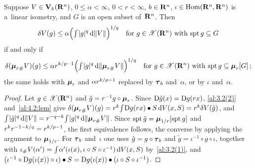 \begin{lemma}
    \label{al:8.2}
    Suppose $V \in \mathbf{V}_{k}(\mathbf{R}^{n})$, $0 \le \alpha < \infty$, $0 < r < \infty$, $b \in
    \mathbf{R}^{n}$, $\iota \in \operatorname{Hom}(\mathbf{R}^{n},\mathbf{R}^{n})$ is a~linear isometry, and $G$ is an open
    subset of~$\mathbf{R}^{n}$. Then
    \begin{displaymath}
        \delta V(g) \le \alpha \Big( {\textstyle\int_{}^{}} |g|^q \,\mathrm{d} \|V\| \Big)^{1/q} \quad \text{for $g \in
        \mathscr{X}(\mathbf{R}^{n})$ with $\operatorname{spt} g \subseteq G$}
    \end{displaymath}
    if and only if
    \begin{displaymath}
        \delta(\boldsymbol{\mu}_{r \#} V)(g) \le \alpha r^{k/p - 1} \Big( {\textstyle\int_{}^{}} |g|^q \,\mathrm{d}
        \|\boldsymbol{\mu}_{r \#} V\| \Big)^{1/q} \quad \text{for $g \in \mathscr{X}(\mathbf{R}^{n})$ with $\operatorname{spt} g
        \subseteq \boldsymbol{\mu}_{r}[G]$} \,;
    \end{displaymath}
    the same holds with $\boldsymbol{\mu}_{r}$ and $\alpha r^{k/p-1}$ replaced by $\boldsymbol{\tau}_{b}$ and~$\alpha$,
    or by $\iota$ and~$\alpha$.
\end{lemma}

\begin{proof}
    Let $g \in \mathscr{X}(\mathbf{R}^{n})$ and $\tilde g = r^{-1} g \circ \boldsymbol{\mu}_{r}$. Since $\mathrm{D} \tilde g(x) =
    \mathrm{D} g(r x)$, \ref{al:3.2(2)} and~\ref{al:4.2:lem} give $\delta(\boldsymbol{\mu}_{r \#} V)(g) = r^{k}
    {\textstyle\int_{}^{}} \mathrm{D} g(r x) \bullet S \,\mathrm{d} V(x,S) = r^{k} \delta V(\tilde g)$, and ${\textstyle\int_{}^{}}
    |\tilde g|^q \,\mathrm{d} \|V\| = r^{-q-k} {\textstyle\int_{}^{}} |g|^q \,\mathrm{d} \|\boldsymbol{\mu}_{r \#} V\|$. Since $\operatorname{spt}
    \tilde g = \boldsymbol{\mu}_{1/r}[\operatorname{spt} g]$ and $r^{k} r^{-1-k/q} = r^{k/p-1}$, the first
    equivalence follows, the converse by applying the argument to $\boldsymbol{\mu}_{1/r}$. For $\boldsymbol{\tau}_{b}$
    and~$\iota$ one uses $\tilde g = g \circ \boldsymbol{\tau}_{b}$ and $\tilde g = \iota^{-1} \circ g \circ
    \iota$, together with $\iota_\# V(\alpha') = {\textstyle\int_{}^{}} \alpha'(\iota(x), \iota \circ S \circ
    \iota^{-1}) \,\mathrm{d} V(x,S)$ by~\ref{al:3.2(1)}, and $(\iota^{-1} \circ \mathrm{D} g(\iota(x)) \circ \iota)
    \bullet S = \mathrm{D} g(\iota(x)) \bullet (\iota \circ S \circ \iota^{-1})$.
\end{proof}

